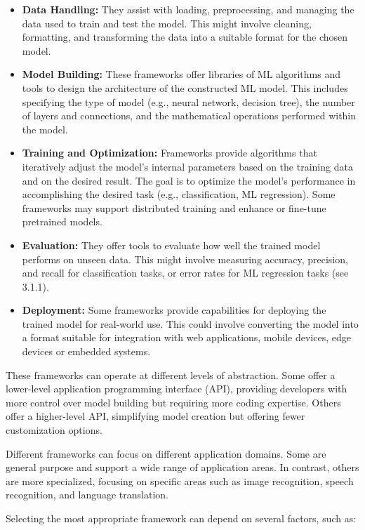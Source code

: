 \documentclass[
  letterpaper,
  DIV=11,
  numbers=noendperiod,
  oneside]{scrreprt}
\begin{document}
\begin{tcolorbox}
\begin{itemize}
\item
  \textbf{Data Handling:} They assist with loading, preprocessing, and
  managing the data used to train and test the model. This might involve
  cleaning, formatting, and transforming the data into a suitable format
  for the chosen model.
\item
  \textbf{Model Building:} These frameworks offer libraries of ML
  algorithms and tools to design the architecture of the constructed ML
  model. This includes specifying the type of model (e.g., neural
  network, decision tree), the number of layers and connections, and the
  mathematical operations performed within the model.
\item
  \textbf{Training and Optimization:} Frameworks provide algorithms that
  iteratively adjust the model's internal parameters based on the
  training data and on the desired result. The goal is to optimize the
  model's performance in accomplishing the desired task (e.g.,
  classification, ML regression). Some frameworks may support
  distributed training and enhance or fine-tune pretrained models.
\item
  \textbf{Evaluation:} They offer tools to evaluate how well the trained
  model performs on unseen data. This might involve measuring accuracy,
  precision, and recall for classification tasks, or error rates for ML
  regression tasks (see 3.1.1).
\item
  \textbf{Deployment:} Some frameworks provide capabilities for
  deploying the trained model for real-world use. This could involve
  converting the model into a format suitable for integration with web
  applications, mobile devices, edge devices or embedded systems.
\end{itemize}

These frameworks can operate at different levels of abstraction. Some
offer a lower-level application programming interface (API), providing
developers with more control over model building but requiring more
coding expertise. Others offer a higher-level API, simplifying model
creation but offering fewer customization options.

Different frameworks can focus on different application domains. Some
are general purpose and support a wide range of application areas. In
contrast, others are more specialized, focusing on specific areas such
as image recognition, speech recognition, and language translation.

Selecting the most appropriate framework can depend on several factors,
such as:


\end{tcolorbox}
\end{document}
